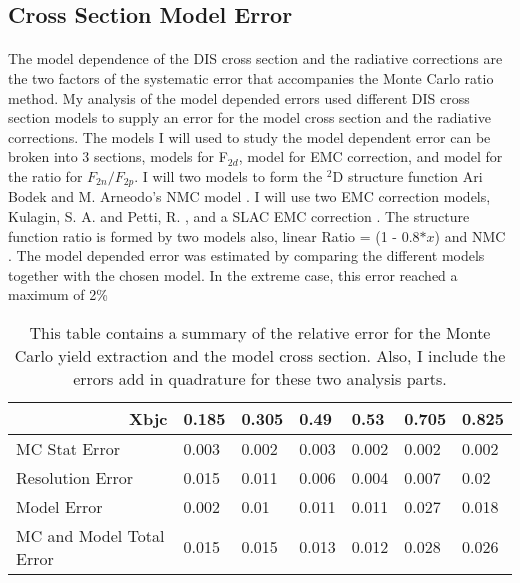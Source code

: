 \subsection{Cross Section Model Error}
\paragraph{}
The model dependence of the DIS cross section and the radiative corrections are the two factors of the systematic error that accompanies the Monte Carlo ratio method. My analysis of the model depended errors used different DIS cross section models to supply an error for the model cross section and the radiative corrections. The models I will used to study the model dependent error can be broken into 3 sections, models for F$_{2d}$, model for EMC correction, and model for the ratio for $F_{2n}/F_{2p}$. I will two models to form the $^2$D structure function Ari Bodek \cite{DISmodel} and M. Arneodo's NMC model \cite{NMC_model}. I will use two EMC correction models, Kulagin, S. A. and Petti, R. \cite{kpmodel}, and a SLAC EMC correction \cite{SLAC_bodek}. The structure function ratio is formed by two models also, linear Ratio = (1 - 0.8$*x$) and NMC \cite{NMC_ratio}. The model depended error was estimated by comparing the different models together with the chosen model. In the extreme case, this error reached a maximum of 2\%    
\begin{table}[]
	\caption{This table contains a summary of the relative error for the Monte Carlo yield extraction and the model cross section. Also, I include the errors add in quadrature for these two analysis parts. }
	\label{MC_ErrT}
	\begin{tabular}{|l|l|l|l|l|l|l|}
		\hline
		\multicolumn{1}{|r|}{\textbf{Xbjc}} & \textbf{0.185} & \textbf{0.305} & \textbf{0.49} & \textbf{0.53} & \textbf{0.705} & \textbf{0.825} \\ \hline
		MC Stat Error                           & 0.003          & 0.002          & 0.003         & 0.002         & 0.002          & 0.002          \\ \hline
		Resolution Error                       & 0.015          & 0.011          & 0.006         & 0.004         & 0.007          & 0.02           \\ \hline
		Model Error                    & 0.002          & 0.01           & 0.011         & 0.011         & 0.027          & 0.018          \\ \hline
		MC and Model Total Error   & 0.015          & 0.015          & 0.013         & 0.012         & 0.028          & 0.026          \\ \hline
	\end{tabular}
\end{table}

